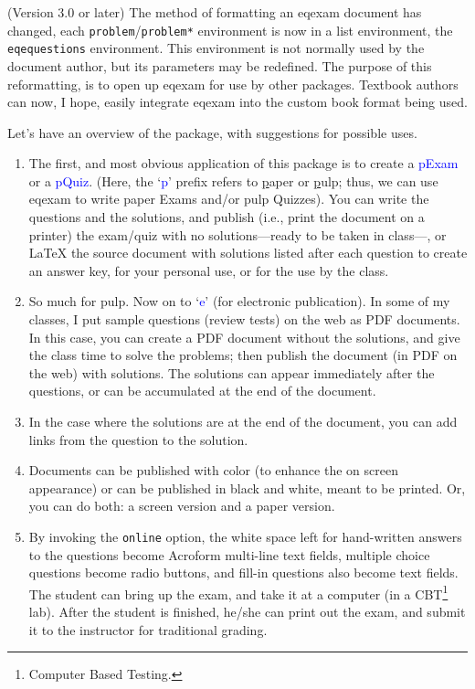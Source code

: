 \documentclass{article}
\def\PDF{PDF}\def\URL{URL}
\begin{document}
\newtopic (Version 3.0 or later) The method of formatting an \textsf{eqexam}
document has changed, each \texttt{problem}/\texttt{problem*} environment
is now in a list environment, the \texttt{eqequestions} environment. This
environment is not normally used by the document author, but its
parameters may be redefined. The purpose of this reformatting, is to open
up \textsf{eqexam} for use by other packages. Textbook authors can now, I
hope, easily integrate \textsf{eqexam} into the custom book format
being used.

\newtopic Let's have an overview of the package, with suggestions for
possible uses.
\begin{enumerate}
    \item The first, and most obvious application of this package
    is to create a \textcolor{blue}{pExam} or a
    \textcolor{blue}{pQuiz}. (Here, the `\textcolor{blue}{p}'
    prefix refers to \underline paper or \underline pulp; thus, we
    can use \textsf{eqexam} to write paper Exams and/or pulp
    Quizzes).  You can write the questions and the solutions, and
    publish (i.e., print the document on a printer) the exam/quiz
    with no solutions---ready to be taken in class---, or {\LaTeX}
    the source document with solutions listed after each question
    to create an answer key, for your personal use, or for the use
    by the class.

    \item So much for pulp. Now on to `\textcolor{blue}{e}' (for
    electronic publication). In some of my classes, I put sample
    questions (review tests) on the web as {\PDF} documents. In
    this case, you can create a {\PDF} document without the
    solutions, and give the class time to solve the problems; then
    publish the document (in {\PDF} on the web) with solutions.
    The solutions can appear immediately after the questions, or
    can be accumulated at the end of the document.

    \item[] In the case where the solutions are at the end of the
    document, you can add links from the question to the solution.

    \item[] Documents can be published with color (to enhance the
    on screen appearance) or can be published in black and white,
    meant to be printed. Or, you can do both: a screen
    version and a paper version.

    \item By invoking the \texttt{online} option, the white space
    left for hand-written answers to the questions become Acroform
    multi-line text fields, multiple choice questions become radio
    buttons, and fill-in questions also become text fields. The
    student can bring up the exam, and take it at a computer (in a
    CBT\footnote{Computer Based Testing.} lab). After the student
    is finished, he/she can print out the exam, and submit it to
    the instructor for traditional grading.


\end{enumerate}
\end{document}
